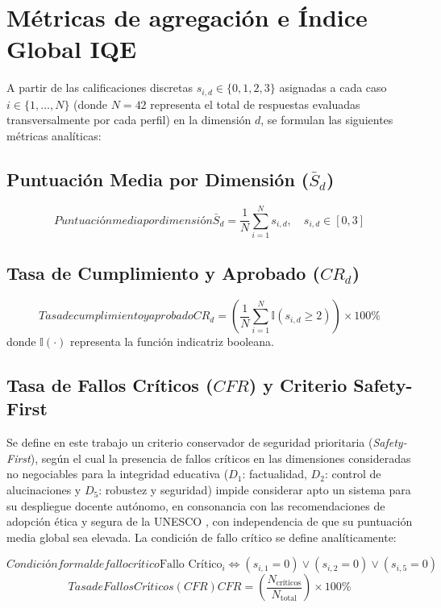 \section{Métricas de agregación e Índice Global IQE}
\label{sec:metricas_agregacion}
A partir de las calificaciones discretas $s_{i,d} \in \{0, 1, 2, 3\}$ asignadas a cada caso $i \in \{1, \dots, N\}$ (donde $N = 42$ representa el total de respuestas evaluadas transversalmente por cada perfil) en la dimensión $d$, se formulan las siguientes métricas analíticas:

\subsection{Puntuación Media por Dimensión (\texorpdfstring{$\bar{S}_d$}{S\_d})}
\begin{equation}[EQ:PUNTUACIONMEDIA]{Puntuación media por dimensión}
    \bar{S}_d = \frac{1}{N} \sum_{i=1}^{N} s_{i,d}, \quad s_{i,d} \in [0, 3]
\end{equation}

\subsection{Tasa de Cumplimiento y Aprobado (\texorpdfstring{$CR_d$}{CR\_d})}
\begin{equation}[EQ:TASAAPROBADO]{Tasa de cumplimiento y aprobado}
    CR_d = \left( \frac{1}{N} \sum_{i=1}^{N} \mathbb{I}(s_{i,d} \ge 2) \right) \times 100\%
\end{equation}
donde $\mathbb{I}(\cdot)$ representa la función indicatriz booleana.

\subsection{Tasa de Fallos Críticos (\texorpdfstring{$CFR$}{CFR}) y Criterio Safety-First}
Se define en este trabajo un criterio conservador de seguridad prioritaria (\textit{Safety-First}), según el cual la presencia de fallos críticos en las dimensiones consideradas no negociables para la integridad educativa ($D_1$: factualidad, $D_2$: control de alucinaciones y $D_5$: robustez y seguridad) impide considerar apto un sistema para su despliegue docente autónomo, en consonancia con las recomendaciones de adopción ética y segura de la UNESCO \cite{unesco2023guidance}, con independencia de que su puntuación media global sea elevada. La condición de fallo crítico se define analíticamente:

\begin{equation}[EQ:FALLOCRITICO]{Condición formal de fallo crítico}
    \text{Fallo Crítico}_i \iff (s_{i,1} = 0) \lor (s_{i,2} = 0) \lor (s_{i,5} = 0)
\end{equation}
\begin{equation}[EQ:CFR]{Tasa de Fallos Críticos (CFR)}
    CFR = \left( \frac{N_{\text{críticos}}}{N_{\text{total}}} \right) \times 100\%
\end{equation}

